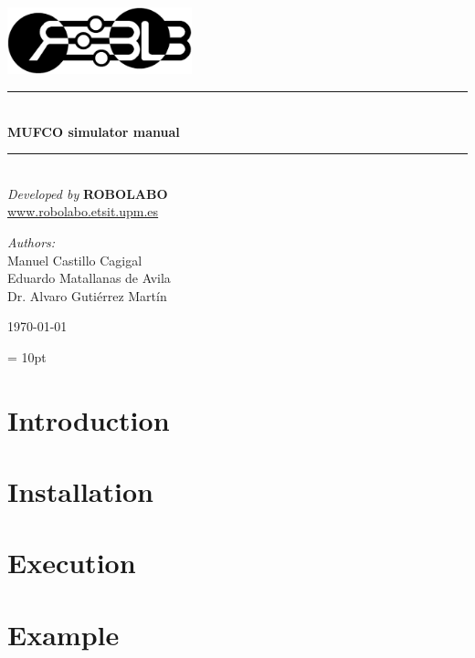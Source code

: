 \documentclass[a4paper, oneside, 11pt]{article}
\newcommand{\HRule}{\rule{\linewidth}{0.5mm}}
\begin{document}
\begin{titlepage}
\begin{center}
\includegraphics[width=0.4\textwidth]{./robolabo_logo}\\[1.5cm]
\HRule \\[0.4cm]
{ \huge \bfseries MUFCO simulator manual \\[0.4cm] }
\HRule \\[1.5cm]
{\Large
\emph{Developed by} {\bf ROBOLABO} \\[0.3cm]
}
\href{www.robolabo.etsit.upm.es}{www.robolabo.etsit.upm.es}
\vfill
\begin{flushleft} \large
\emph{Authors:}\\
Manuel Castillo Cagigal\\
Eduardo Matallanas de Avila\\
Dr. Alvaro Guti\'errez Mart\'in
\end{flushleft}
\vspace{1.0cm}
{\large \today}
\end{center}
\end{titlepage}

\newpage
\tableofcontents
\newpage 

\baselineskip=15pt
\parskip = 10pt
\marginsize{3cm}{3cm}{2cm}{2cm}

\section{Introduction}

\section{Installation}

\section{Execution}

\section{Example}
\end{document}
